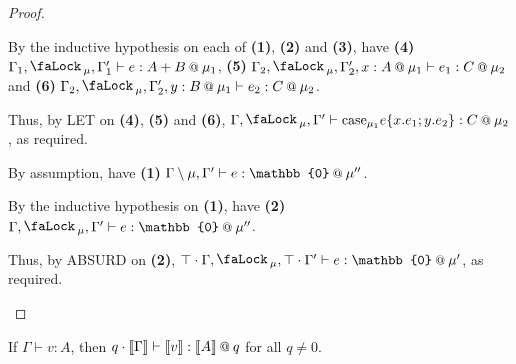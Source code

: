 \documentclass[acmsmall,screen,nonacm]{acmart}
\makeatletter
\newcommand{\at}{\mathbin{\mbox{\small\ensuremath{@}}}}
\newcommand{\zero}{\mathbb{0}}
\newcommand{\tee}{\vdash}
\DeclareMathOperator{\lock}{\tikz{\node[scale=1, line width=0pt, inner sep=0pt] at (0,0) {\faLock\,};}}
\newcommand{\sem}[1]{\llbracket #1 \rrbracket}
\makeatother
\begin{document}
\begin{proof}
\begin{description}
    By the inductive hypothesis on each of \textbf{(1)}, \textbf{(2)} and \textbf{(3)}, have \textbf{(4)} $\Gamma_1, \lock_\mu, \Gamma^\prime_1 \tee e : A + B \at \mu_1$, \textbf{(5)} $\Gamma_2, \lock_\mu, \Gamma^\prime_2, x : A \at \mu_1 \tee e_1 : C \at \mu_2$ and \textbf{(6)} $\Gamma_2, \lock_\mu, \Gamma^\prime_2, y : B \at \mu_1 \tee e_2 : C \at \mu_2$.
    
    Thus, by LET on \textbf{(4)}, \textbf{(5)} and \textbf{(6)}, $\Gamma, \lock_\mu, \Gamma^\prime \tee \mathrm{case}_{\mu_1} e \{x.e_1; y.e_2\} : C \at \mu_2$, as required.
    \\
    \item[Case ABSURD.]
    By assumption, have \textbf{(1)} $\Gamma \setminus \mu, \Gamma^\prime \tee e : \zero \at \mu^{\prime\prime}$. 
    
    By the inductive hypothesis on \textbf{(1)}, have \textbf{(2)} $\Gamma, \lock_\mu, \Gamma^\prime \tee e : \zero \at \mu^{\prime\prime}$. 
    
    Thus, by ABSURD on \textbf{(2)}, $\top \cdot \Gamma, \lock_\mu, \top \cdot \Gamma^\prime \tee e : \zero \at \mu^\prime$, as required.
  \end{description}
\end{proof}

\begin{theorem}
\label{thm:graded-modal-to-mode-qualifiers-vals}
  If\/ $\Gamma \tee v : A$, then $q \cdot \sem{\Gamma} \tee \sem{v} : \sem{A} \at q$ for all $q \neq 0$. 
\end{theorem}
\end{document}
